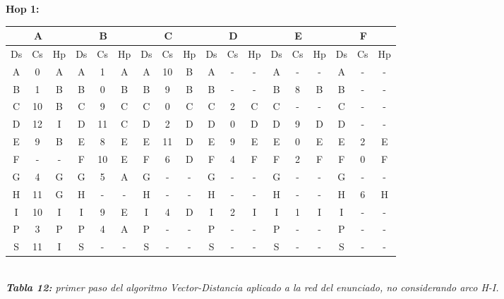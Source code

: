 \documentclass[letterpaper,10pt,onecolumn,titlepage]{article}
\begin{document}
\textbf{Hop 1:}
 \begin{center}
   \begin{tabular}{|c|c|c|c|c|c|c|c|c|c|c|c|c|c|c|c|c|c|} \hline
    \multicolumn{3}{|c|}{A} & \multicolumn{3}{|c|}{B} & \multicolumn{3}{|c|}{C} & \multicolumn{3}{|c|}{D} & \multicolumn{3}{|c|}{E} & \multicolumn{3}{|c|}{F} \\ \hline
     Ds & Cs & Hp & Ds & Cs & Hp & Ds & Cs & Hp & Ds & Cs & Hp & Ds & Cs & Hp & Ds & Cs & Hp \\ \hline
     A  & 0  & A  & A  & 1  & A  & A  & 10  & B  & A  & -  & -  & A  & -  & -  & A  & -  & - \\ \hline
     B  & 1  & B  & B  & 0  & B  & B  & 9  & B  & B  & -  & -  & B  & 8  & B & B  & -  & - \\ \hline
     C  & 10  & B  & C  & 9  & C  & C  & 0  & C  & C  & 2  & C  & C  & -  & -  & C  & -  & - \\ \hline
     D  & 12  & I  & D  & 11  & C & D  & 2  & D  & D  & 0  & D  & D  & 9  & D  & D  & -  & - \\ \hline
     E  & 9  & B  & E  & 8  & E  & E  & 11  & D  & E  & 9  & E  & E  & 0  & E  & E  & 2  & E \\ \hline
     F  & -  & -  & F  & 10  & E  & F  & 6  & D  & F  & 4  & F  & F  & 2  & F  & F  & 0  & F \\ \hline
     G  & 4  & G  & G  & 5  & A  & G  & -  & -  & G  & -  & -  & G  & -  & -  & G  & -  & - \\ \hline
     H  & 11  & G  & H  & -  & -  & H  & -  & -  & H  & -  & -  & H  & -  & -  & H  & 6  & H \\ \hline
     I  & 10  & I  & I  & 9  & E  & I  & 4  & D  & I  & 2  & I  & I  & 1  & I  & I  & -  & - \\ \hline
     P  & 3  & P  & P  & 4  & A  & P  & -  & -  & P  & -  & -  & P  & -  & -  & P  & -  & - \\ \hline
     S  & 11  & I  & S  & -  & -  & S  & -  & -  & S  & -  & -  & S  & -  & -  & S  & -  & - \\ \hline
   \end{tabular}\\
   \textit{\textbf{Tabla 12:} primer paso del algoritmo Vector-Distancia aplicado a la red del enunciado, no considerando arco H-I.}
 \end{center}
 
\end{document}
